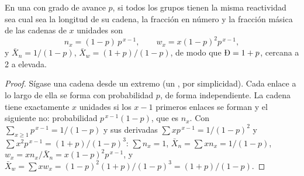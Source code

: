 \begin{theorem}\label{thm:b2:polymer-synthesis:flory}
En una  con grado de avance $p$, si todos los grupos tienen la misma reactividad sea cual sea la
longitud de su cadena, la fracción en número y la fracción másica de las cadenas de $x$ unidades son
\begin{equation*}
n_x = (1-p)\,p^{\,x-1}, \qquad w_x = x(1-p)^2 p^{\,x-1},
\end{equation*}
y $\bar X_n = 1/(1-p)$, $\bar X_w = (1+p)/(1-p)$, de modo que $\text{\DH} = 1 + p$, cercana a 2 a 
elevada.
\end{theorem}

\begin{proof}
Sígase una cadena desde un extremo (un  , por simplicidad). Cada enlace a lo largo de ella se forma con
probabilidad $p$, de forma independiente. La cadena tiene exactamente $x$ unidades si los $x-1$ primeros enlaces se forman
y el siguiente no: probabilidad $p^{\,x-1}(1-p)$, que es $n_x$. Con $\sum_{x\ge1} p^{\,x-1} =
1/(1-p)$ y sus derivadas $\sum x p^{\,x-1} = 1/(1-p)^2$ y $\sum x^2 p^{\,x-1} = (1+p)/(1-p)^3$:
$\sum n_x = 1$, $\bar X_n = \sum x n_x = 1/(1-p)$, $w_x = x n_x/\bar X_n = x(1-p)^2p^{\,x-1}$, y
$\bar X_w = \sum x w_x = (1-p)^2(1+p)/(1-p)^3 = (1+p)/(1-p)$.
\end{proof}

